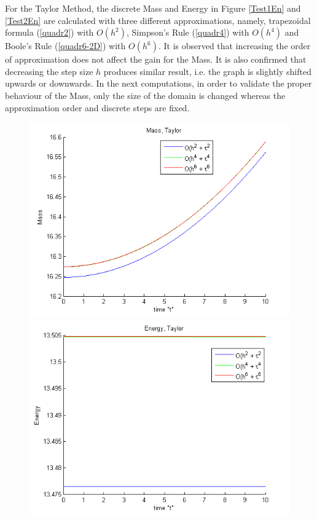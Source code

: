 \documentclass[%
 aip,
cp,  %
 amsmath,amssymb,%
 reprint,%
]{revtex4-2}
\newcommand{\rf}[1]{(\ref{#1})}
\begin{document}
For the Taylor Method, the discrete Mass and Energy in Figure \ref{Test1En} and \ref{Test2En} are calculated with three different approximations, namely, trapezoidal formula \rf{quadr2} with $O(h^2)$, Simpson's Rule \rf{quadr4} with $O(h^4)$ and Boole's Rule \rf{quadr6-2D} with $O(h^6)$. It is observed that increasing the order of approximation does not affect the gain for the Mass. It is also confirmed that decreasing the step size $h$ produces similar result, i.e. the graph is slightly shifted upwards or downwards. In the next computations, in order to validate the proper behaviour of the Mass, only the size of the domain is changed whereas the approximation order and discrete steps are fixed.
\iffalse
\begin{figure}[ht]\vspace{0.4cm}
	\begin{minipage}[b]{0.33\linewidth}
		 \includegraphics[width=\linewidth]{figures/Mass_bt1_c090_h010_x3O.png}
	\end{minipage}	
	\begin{minipage}[b]{0.33\linewidth}
		\includegraphics[width=\linewidth]{figures/Energy_bt1_c090_h010_x3O.png}
		

\end{minipage}
\end{figure}
\end{document}
